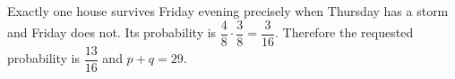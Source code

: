 Exactly one house survives Friday evening precisely when Thursday has a storm and Friday does not. Its probability is $\dfrac{4}{8}\cdot\dfrac{3}{8}=\dfrac{3}{16}$. Therefore the requested probability is $\dfrac{13}{16}$ and $\boxed{p+q=29}$.
